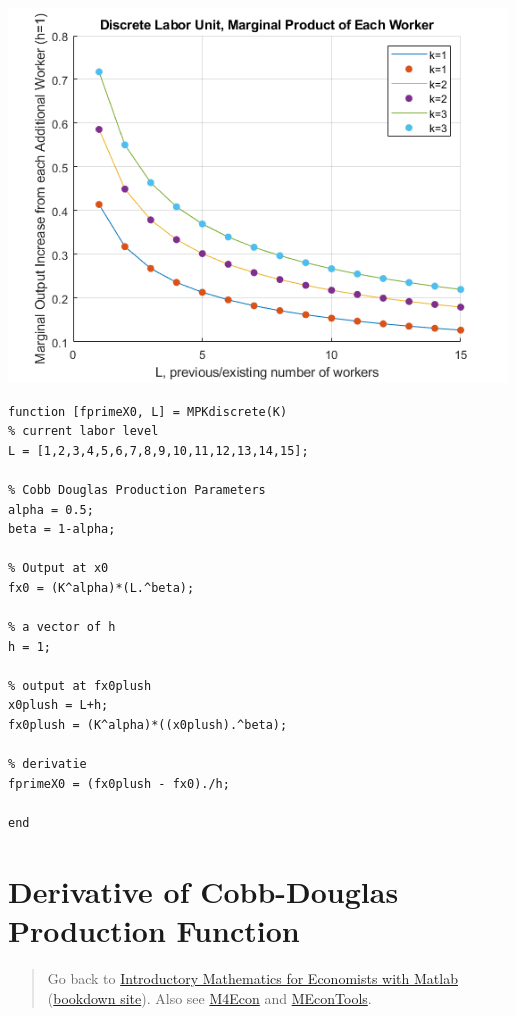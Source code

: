 \documentclass[
]{book}
\begin{document}
\includegraphics[width=5.20833in,height=\textheight]{img/derivative_MPL_discrete_workers_images/figure_1.png}

\begin{verbatim}
function [fprimeX0, L] = MPKdiscrete(K)
% current labor level
L = [1,2,3,4,5,6,7,8,9,10,11,12,13,14,15];

% Cobb Douglas Production Parameters
alpha = 0.5;
beta = 1-alpha;

% Output at x0
fx0 = (K^alpha)*(L.^beta);

% a vector of h
h = 1;

% output at fx0plush
x0plush = L+h;
fx0plush = (K^alpha)*((x0plush).^beta);

% derivatie 
fprimeX0 = (fx0plush - fx0)./h;

end
\end{verbatim}

\hypertarget{derivative-of-cobb-douglas-production-function}{%
\section{Derivative of Cobb-Douglas Production Function}\label{derivative-of-cobb-douglas-production-function}}

\begin{quote}
Go back to \href{https://math4econ.github.io/}{Introductory Mathematics for Economists with Matlab} (\href{https://math4econ.github.io/bookdown}{bookdown site}). Also see \href{http://fanwangecon.github.io/M4Econ}{M4Econ} and \href{https://fanwangecon.github.io/MEconTools/}{MEconTools}.
\end{quote}
\end{document}
